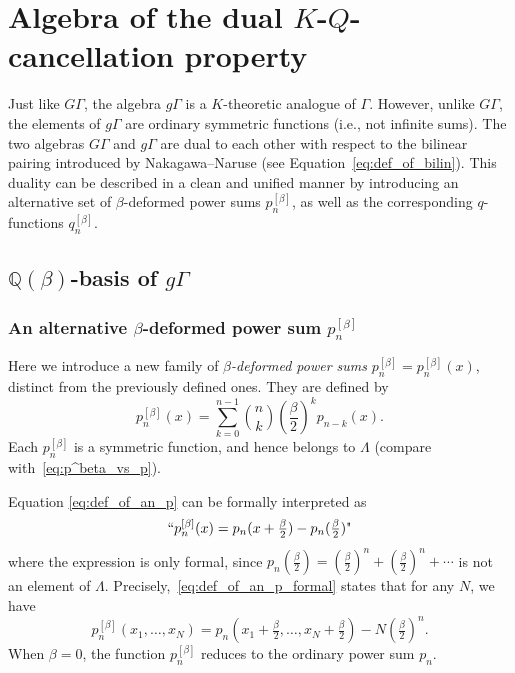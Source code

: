 \documentclass[dvipdfmx]{amsart}
\theoremstyle{definition}
\theoremstyle{remark}
\begin{document}
\section{Algebra of the dual \( K \)-\( Q \)-cancellation property}\label{sec:dualKQ}

Just like \( G\Gamma \), the algebra \( g\Gamma \) is a \( K \)-theoretic analogue of \( \Gamma \).  
However, unlike \( G\Gamma \), the elements of \( g\Gamma \) are ordinary symmetric functions (i.e., not infinite sums).  
The two algebras \( G\Gamma \) and \( g\Gamma \) are dual to each other with respect to the bilinear pairing introduced by Nakagawa–Naruse (see Equation~\eqref{eq:def_of_bilin}).
This duality can be described in a clean and unified manner by introducing an alternative set of \( \beta \)-deformed power sums \( p_n^{[\beta]} \), as well as the corresponding \( q \)-functions \( q_n^{[\beta]} \).

\subsection{\( \mathbb{Q}(\beta) \)-basis of \( g\Gamma \)}\label{sec:dualgGamma}

\subsubsection{An alternative \( \beta \)-deformed power sum \( p_n^{[\beta]} \)}

Here we introduce a new family of \textit{\( \beta \)-deformed power sums} \( p_n^{[\beta]} = p_n^{[\beta]}(x) \), distinct from the previously defined ones. They are defined by
\begin{equation}\label{eq:def_of_an_p}
p_n^{[\beta]}(x) = \sum_{k=0}^{n-1} \binom{n}{k} \left( \frac{\beta}{2} \right)^k p_{n-k}(x).
\end{equation}
Each \( p_n^{[\beta]} \) is a symmetric function, and hence belongs to \( \Lambda \) (compare with~\eqref{eq:p^beta_vs_p}).

Equation \eqref{eq:def_of_an_p} can be formally interpreted as
\begin{equation}\label{eq:def_of_an_p_formal}
\text{``\( p_n^{[\beta]}(x) = p_n(x + \tfrac{\beta}{2}) - p_n(\tfrac{\beta}{2}) \)"}
\end{equation}
where the expression is only formal, since \( p_n(\tfrac{\beta}{2}) = (\tfrac{\beta}{2})^n + (\tfrac{\beta}{2})^n + \cdots \) is not an element of \( \Lambda \).
Precisely,~\eqref{eq:def_of_an_p_formal} states that for any \( N \), we have
\begin{equation}\label{eq:betap_condition}
p_n^{[\beta]}(x_1, \dots, x_N) = 
p_n(x_1 + \tfrac{\beta}{2}, \dots, x_N + \tfrac{\beta}{2}) - N\left( \tfrac{\beta}{2} \right)^n.
\end{equation}
When \( \beta = 0 \), the function \( p_n^{[\beta]} \) reduces to the ordinary power sum \( p_n \).
\end{document}
